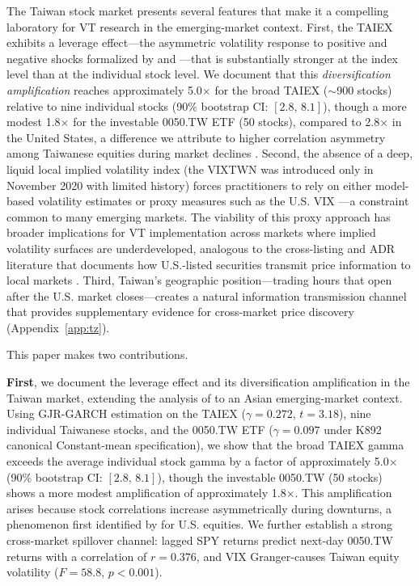 The Taiwan stock market presents several features that make it a compelling laboratory for VT research in the emerging-market context. First, the TAIEX exhibits a leverage effect---the asymmetric volatility response to positive and negative shocks formalized by \citet{black1976} and \citet{glosten1993}---that is substantially stronger at the index level than at the individual stock level. We document that this \textit{diversification amplification} reaches approximately 5.0$\times$ for the broad TAIEX ($\sim$900 stocks) relative to nine individual stocks (90\% bootstrap CI: $[2.8, \, 8.1]$), though a more modest 1.8$\times$ for the investable 0050.TW ETF (50 stocks), compared to 2.8$\times$ in the United States, a difference we attribute to higher correlation asymmetry among Taiwanese equities during market declines \citep{ang2002}. Second, the absence of a deep, liquid local implied volatility index (the VIXTWN was introduced only in November 2020 with limited history) forces practitioners to rely on either model-based volatility estimates or proxy measures such as the U.S. VIX \citep{whaley2000,whaley2009}---a constraint common to many emerging markets. The viability of this proxy approach has broader implications for VT implementation across markets where implied volatility surfaces are underdeveloped, analogous to the cross-listing and ADR literature that documents how U.S.-listed securities transmit price information to local markets \citep{gagnon2010}. Third, Taiwan's geographic position---trading hours that open after the U.S. market closes---creates a natural information transmission channel \citep{eun1989,hamao1990,lin1994} that provides supplementary evidence for cross-market price discovery (Appendix~\ref{app:tz}).

This paper makes two contributions.

\textbf{First}, we document the leverage effect and its diversification amplification in the Taiwan market, extending the analysis of \citet{ang2002} to an Asian emerging-market context. Using GJR-GARCH estimation on the TAIEX ($\gamma = 0.272$, $t = 3.18$), nine individual Taiwanese stocks, and the 0050.TW ETF ($\gamma = 0.097$ under K892 canonical Constant-mean specification), we show that the broad TAIEX gamma exceeds the average individual stock gamma by a factor of approximately 5.0$\times$ (90\% bootstrap CI: $[2.8, \, 8.1]$), though the investable 0050.TW (50 stocks) shows a more modest amplification of approximately 1.8$\times$. This amplification arises because stock correlations increase asymmetrically during downturns, a phenomenon first identified by \citet{ang2002} for U.S. equities. We further establish a strong cross-market spillover channel: lagged SPY returns predict next-day 0050.TW returns with a correlation of $r = 0.376$, and VIX Granger-causes Taiwan equity volatility ($F = 58.8$, $p < 0.001$).

